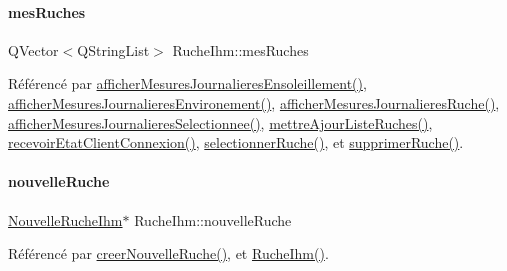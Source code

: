 \mbox{\label{class_ruche_ihm_ab7741fa67b19cbb2da7eb12c58cf83c1}} 
\paragraph{\texorpdfstring{mes\+Ruches}{mesRuches}}
{\footnotesize\ttfamily Q\+Vector$<$Q\+String\+List$>$ Ruche\+Ihm\+::mes\+Ruches\hspace{0.3cm}{\ttfamily [private]}}



Référencé par \hyperlink{class_ruche_ihm_abc250d15e6782c522b3d6676e0ee032d}{afficher\+Mesures\+Journalieres\+Ensoleillement()}, \hyperlink{class_ruche_ihm_a5ee5942435915ca134765f42ff4b9061}{afficher\+Mesures\+Journalieres\+Environement()}, \hyperlink{class_ruche_ihm_a94bd98327a73a15aad1306fc31f53ce8}{afficher\+Mesures\+Journalieres\+Ruche()}, \hyperlink{class_ruche_ihm_a7f66af552d9e7ba0d00437ff3b330706}{afficher\+Mesures\+Journalieres\+Selectionnee()}, \hyperlink{class_ruche_ihm_a77cb005fde7e2271e8721c23cef13b3e}{mettre\+Ajour\+Liste\+Ruches()}, \hyperlink{class_ruche_ihm_a3a3dae9de8c51344aa6e3463db9e6ad9}{recevoir\+Etat\+Client\+Connexion()}, \hyperlink{class_ruche_ihm_a7324ae6ea574ccdad47783f466933157}{selectionner\+Ruche()}, et \hyperlink{class_ruche_ihm_a85729b1ae4f3dfb5130eb45f5a426e3c}{supprimer\+Ruche()}.

\mbox{\label{class_ruche_ihm_a3a27b7af842244c6db3623f5f256bed5}} 
\paragraph{\texorpdfstring{nouvelle\+Ruche}{nouvelleRuche}}
{\footnotesize\ttfamily \hyperlink{class_nouvelle_ruche_ihm}{Nouvelle\+Ruche\+Ihm}$\ast$ Ruche\+Ihm\+::nouvelle\+Ruche\hspace{0.3cm}{\ttfamily [private]}}



Référencé par \hyperlink{class_ruche_ihm_a2a106515c13c06c51799432a1c2baa3b}{creer\+Nouvelle\+Ruche()}, et \hyperlink{class_ruche_ihm_a04c2544ba4e9cca6c38f553c32d63dee}{Ruche\+Ihm()}.

\mbox{\label{class_ruche_ihm_a04068fbec978c2443f3baf08d4945929}} 
